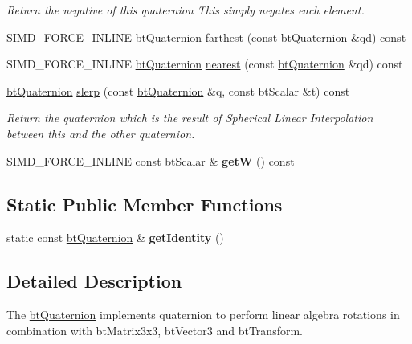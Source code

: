 \begin{DoxyCompactItemize}
\begin{DoxyCompactList}\small\item\em Return the negative of this quaternion This simply negates each element. \end{DoxyCompactList}\item 
S\+I\+M\+D\+\_\+\+F\+O\+R\+C\+E\+\_\+\+I\+N\+L\+I\+N\+E \hyperlink{classbt_quaternion}{bt\+Quaternion} \hyperlink{classbt_quaternion_adeda27273475435a9e3223abeea73992}{farthest} (const \hyperlink{classbt_quaternion}{bt\+Quaternion} \&qd) const 
\item 
S\+I\+M\+D\+\_\+\+F\+O\+R\+C\+E\+\_\+\+I\+N\+L\+I\+N\+E \hyperlink{classbt_quaternion}{bt\+Quaternion} \hyperlink{classbt_quaternion_a821a38604c6333b95d954867315d8716}{nearest} (const \hyperlink{classbt_quaternion}{bt\+Quaternion} \&qd) const 
\item 
\hyperlink{classbt_quaternion}{bt\+Quaternion} \hyperlink{classbt_quaternion_ac95a27feda1c165b2ce359e7415fec6f}{slerp} (const \hyperlink{classbt_quaternion}{bt\+Quaternion} \&q, const bt\+Scalar \&t) const 
\begin{DoxyCompactList}\small\item\em Return the quaternion which is the result of Spherical Linear Interpolation between this and the other quaternion. \end{DoxyCompactList}\item 
\hypertarget{classbt_quaternion_a672c327a54989f0e54498ef465bb3f3c}{S\+I\+M\+D\+\_\+\+F\+O\+R\+C\+E\+\_\+\+I\+N\+L\+I\+N\+E const bt\+Scalar \& {\bfseries get\+W} () const }\label{classbt_quaternion_a672c327a54989f0e54498ef465bb3f3c}

\end{DoxyCompactItemize}
\subsection*{Static Public Member Functions}
\begin{DoxyCompactItemize}
\item 
\hypertarget{classbt_quaternion_a68fec9bc7f3ce9fee2a7412927b04ffe}{static const \hyperlink{classbt_quaternion}{bt\+Quaternion} \& {\bfseries get\+Identity} ()}\label{classbt_quaternion_a68fec9bc7f3ce9fee2a7412927b04ffe}

\end{DoxyCompactItemize}


\subsection{Detailed Description}
The \hyperlink{classbt_quaternion}{bt\+Quaternion} implements quaternion to perform linear algebra rotations in combination with bt\+Matrix3x3, bt\+Vector3 and bt\+Transform. 

